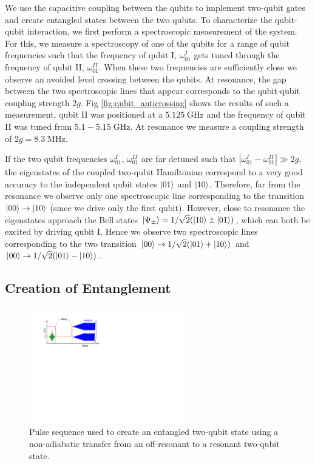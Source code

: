 We use the capacitive coupling between the qubits to implement two-qubit gates and create entangled states between the two qubits. To characterize the qubit-qubit interaction, we first perform a spectroscopic measurement of the system. For this, we measure a spectroscopy of one of the qubits for a range of qubit frequencies such that the frequency of qubit I, $\omega_{01}^I$ gets tuned through the frequency of qubit II, $\omega_{01}^{II}$. When these two frequencies are sufficiently close we observe an avoided level crossing between the qubits. At resonance, the gap between the two spectroscopic lines that appear corresponds to the qubit-qubit coupling strength $2g$. Fig \ref{fig:qubit_anticrossing} shows the results of such a measurement, qubit II was positioned at a $5.125\;\mathrm{GHz}$ and the frequency of qubit II was tuned from $5.1-5.15\;\mathrm{GHz}$. At resonance we measure a coupling strength of $2g = 8.3\;\mathrm{MHz}$.

\smallskip

If the two qubit frequencies $\omega_{01}^I$, $\omega_{01}^{II}$ are far detuned such that $|\omega_{01}^I-\omega_{01}^{II}|\gg 2g$, the eigenstates of the coupled two-qubit Hamiltonian correspond to a very good accuracy to the independent qubit states $\left| 01 \right>$ and $\left| 10 \right>$. Therefore, far from the resonance we observe only one spectroscopic line corresponding to the transition $\left| 00 \right>\to\left| 10 \right>$ (since we drive only the first qubit). However, close to resonance the eigenstates approach the Bell states $\left| \Psi_\pm \right> = 1/\sqrt{2}(\left| 10 \right>\pm\left| 01 \right>)$, which can both be excited by driving qubit I. Hence we observe two spectroscopic lines corresponding to the two transition $\left| 00 \right>\to 1/\sqrt{2}(\left| 01 \right>+\left| 10 \right>)$ and $\left| 00 \right>\to 1/\sqrt{2}(\left| 01 \right>-\left| 10 \right>)$. 

\subsection{Creation of Entanglement} \label{section:creation_of_entanglement}

\begin{figure}
	\centering
	\includegraphics[width=0.6\textwidth]{"./material/figures/measurement/qubit_swap"}
	\caption[Pulse sequence used to create an entangled two-qubit state]{Pulse sequence used to create an entangled two-qubit state using a non-adiabatic transfer from an off-resonant to a resonant two-qubit state.}
	\label{fig:qubit_swap_pulse_sequence}
\end{figure}

